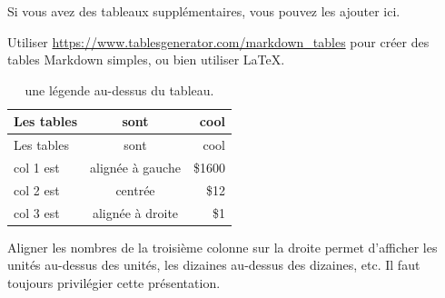 \documentclass[mstat,12pt]{unswthesis}
\begin{document}
Si vous avez des tableaux supplémentaires, vous pouvez les ajouter ici.

Utiliser \url{https://www.tablesgenerator.com/markdown_tables} pour
créer des tables Markdown simples, ou bien utiliser \LaTeX.

\begin{longtable}[]{@{}lcr@{}}
\caption{une légende au-dessus du tableau.
\label{tab7.1}}\tabularnewline
\toprule\noalign{}
Les tables & sont & cool \\
\midrule\noalign{}
\endfirsthead
\toprule\noalign{}
Les tables & sont & cool \\
\midrule\noalign{}
\endhead
\bottomrule\noalign{}
\endlastfoot
col 1 est & alignée à gauche & \$1600 \\
col 2 est & centrée & \$12 \\
col 3 est & alignée à droite & \$1 \\
\end{longtable}

Aligner les nombres de la troisième colonne sur la droite permet
d'afficher les unités au-dessus des unités, les dizaines au-dessus des
dizaines, etc. Il faut toujours privilégier cette présentation.
\end{document}
